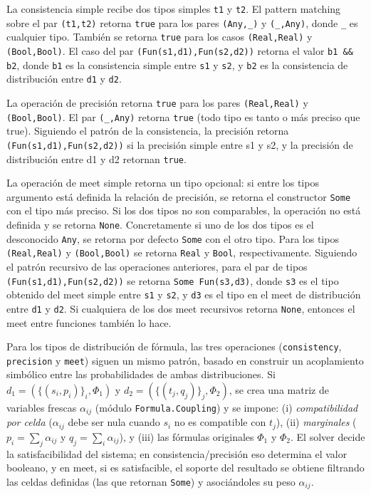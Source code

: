 La consistencia simple recibe dos tipos simples \verb|t1| y
\verb|t2|. El pattern matching sobre el par \verb|(t1,t2)| retorna
\verb|true| para los pares \verb|(Any,_)| y \verb|(_,Any)|, donde
\verb|_| es cualquier tipo. También se retorna \verb|true| para los
casos \verb|(Real,Real)| y \verb|(Bool,Bool)|. El caso del par
\verb|(Fun(s1,d1),Fun(s2,d2))| retorna el valor \verb|b1 && b2|,
donde \verb|b1| es la consistencia simple entre \verb|s1| y \verb|s2|,
y \verb|b2| es la consistencia de distribución entre \verb|d1| y
\verb|d2|.

La operación de precisión retorna \verb|true| para los pares
\verb|(Real,Real)| y \verb|(Bool,Bool)|. El par \verb|(_,Any)| retorna
\verb|true| (todo tipo es tanto o más preciso que true). Siguiendo el
patrón de la consistencia, la precisión retorna
\verb|(Fun(s1,d1),Fun(s2,d2))| si la precisión simple entre s1 y s2, y
la precisión de distribución entre d1 y d2 retornan \verb|true|.


La operación de meet simple retorna un tipo opcional: si entre los tipos argumento está definida la relación de precisión, se retorna el constructor \verb|Some| con el tipo más preciso. Si los dos tipos no son comparables, la operación no está definida y se retorna \verb|None|. Concretamente si uno de los dos tipos es el desconocido \verb|Any|, se retorna por defecto \verb|Some| con el otro tipo. Para los tipos \verb|(Real,Real)| y \verb|(Bool,Bool)| se retorna \verb|Real| y \verb|Bool|, respectivamente.
Siguiendo el patrón recursivo de las operaciones anteriores,
para el par de tipos \verb|(Fun(s1,d1),Fun(s2,d2))| se retorna \verb|Some Fun(s3,d3)|, donde \verb|s3| es el tipo obtenido del meet simple entre \verb|s1| y \verb|s2|, y \verb|d3| es el tipo en el meet de distribución entre \verb|d1| y \verb|d2|. Si cualquiera de los dos meet recursivos retorna \verb|None|, entonces el meet entre funciones también lo hace.

Para los tipos de distribución de fórmula, las tres operaciones (\verb|consistency|, \verb|precision| y \verb|meet|) siguen un mismo patrón, basado en construir un acoplamiento simbólico entre las probabilidades de ambas distribuciones. Si $d_1=(\{(s_i,p_i)\}_i,\Phi_1)$ y $d_2=(\{(t_j,q_j)\}_j,\Phi_2)$, se crea una matriz de variables frescas $\alpha_{ij}$ (módulo \verb|Formula.Coupling|) y se impone: (i) \emph{compatibilidad por celda} ($\alpha_{ij}$ debe ser nula cuando $s_i$ no es compatible con $t_j$), (ii) \emph{marginales} ($p_i=\sum_j \alpha_{ij}$ y $q_j=\sum_i \alpha_{ij}$), y (iii) las fórmulas originales $\Phi_1$ y $\Phi_2$. El solver decide la satisfacibilidad del sistema; en consistencia/precisión eso determina el valor booleano, y en meet, si es satisfacible, el soporte del resultado se obtiene filtrando las celdas definidas (las que retornan \verb|Some|) y asociándoles su peso $\alpha_{ij}$.

